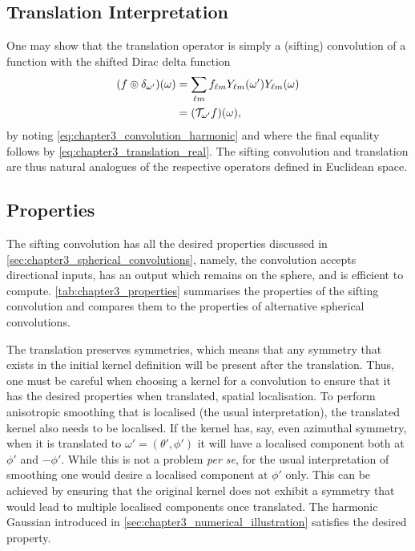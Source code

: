\subsection{Translation Interpretation}\label{sec:chapter3_translation_interpretation}

One may show that the translation operator is simply a (sifting) convolution of a function with the shifted Dirac delta function
%
\begin{align}
	\pixel{\convolution{f}{\delta_{\omega'}}}
	 & = \harmonicSum \harmonic{f} \pixel[']{\harmonic{Y}} \pixel{\harmonic{Y}} \nonumber{} \\
	 & = \pixel{(\translation{\omega'}f)},
\end{align}
%
by noting \cref{eq:chapter3_convolution_harmonic} and where the final equality follows by \cref{eq:chapter3_translation_real}.
The sifting convolution and translation are thus natural analogues of the respective operators defined in Euclidean space.

\subsection{Properties}\label{sec:chapter3_properties}

The sifting convolution has all the desired properties discussed in \cref{sec:chapter3_spherical_convolutions}, namely, the convolution accepts directional inputs, has an output which remains on the sphere, and is efficient to compute.
\cref{tab:chapter3_properties} summarises the properties of the sifting convolution and compares them to the properties of alternative spherical convolutions.

The translation preserves symmetries, which means that any symmetry that exists in the initial kernel definition will be present after the translation.
Thus, one must be careful when choosing a kernel for a convolution to ensure that it has the desired properties when translated, \eg{} spatial localisation.
To perform anisotropic smoothing that is localised (the usual interpretation), the translated kernel also needs to be localised.
If the kernel has, say, even azimuthal symmetry, when it is translated to \(\omega'=(\theta', \phi')\) it will have a localised component both at \(\phi'\) and \(-\phi'\).
While this is not a problem \emph{per se}, for the usual interpretation of smoothing one would desire a localised component at \(\phi'\) only.
This can be achieved by ensuring that the original kernel does not exhibit a symmetry that would lead to multiple localised components once translated.
The harmonic Gaussian introduced in \cref{sec:chapter3_numerical_illustration} satisfies the desired property.

